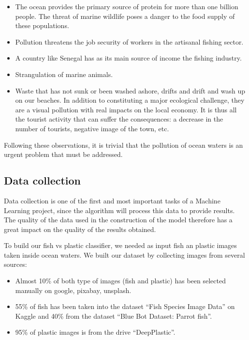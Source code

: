 \documentclass[a4paper, 12pt]{report}
\begin{document}
\begin{itemize}

    \item The ocean provides the primary source of protein for more than one billion people. The threat of marine wildlife poses a danger to the food supply of these populations.

    \item Pollution threatens the job security of workers in the artisanal fishing sector. 

    \item A country like Senegal has as its main source of income the fishing industry.

    \item Strangulation of marine animals.

    \item Waste that has not sunk or been washed ashore, drifts and drift and wash up on our beaches. In addition to constituting a major ecological challenge, they are a visual pollution with real impacts on the local economy. It is thus all the tourist activity that can suffer the consequences: a decrease in the number of tourists, negative image of the town, etc.

\end{itemize}

Following these observations, it is trivial that the pollution of ocean waters is an urgent problem that must be addressed.

\subsection{Data collection}

Data collection is one of the first and most important tasks of a Machine Learning project, since the algorithm will process this data to provide results. The quality of the data used in the construction of the model therefore has a great impact on the quality of the results obtained.

To build our fish vs plastic classifier, we needed as input fish an plastic images taken inside ocean waters. We built our dataset by collecting images from several sources:

\begin{itemize}
    
    \item Almost 10\% of both type of images (fish and plastic) has been selected manually on google, pixabay, unsplash.

    \item 55\% of fish has been taken into the dataset “Fish Species Image Data” on Kaggle\cite{kaggle_fish_1} and 40\% from the dataset “Blue Bot Dataset: Parrot fish”\cite{kaggle_fish_2}.

    \item 95\% of plastic images is from the drive “DeepPlastic”\cite{drive_plastic}.

\end{itemize}
\end{document}
